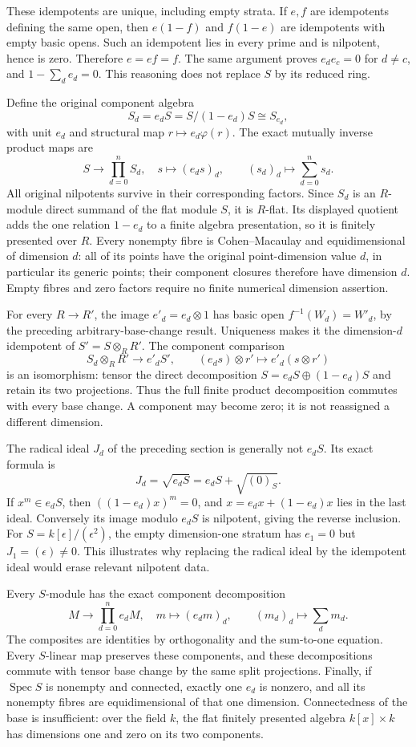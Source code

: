 These idempotents are unique, including empty strata. If \(e,f\) are idempotents defining the same open, then \(e(1-f)\) and \(f(1-e)\) are idempotents with empty basic opens. Such an idempotent lies in every prime and is nilpotent, hence is zero. Therefore \(e=ef=f\). The same argument proves \(e_de_c=0\) for \(d\ne c\), and \(1-\sum_d e_d=0\). This reasoning does not replace \(S\) by its reduced ring.

Define the original component algebra \[
S_d=e_dS=S/(1-e_d)S\cong S_{e_d},
\] with unit \(e_d\) and structural map \(r\mapsto e_d\varphi(r)\). The exact mutually inverse product maps are \[
S\longrightarrow\prod_{d=0}^nS_d,\quad s\longmapsto(e_ds)_d,
\qquad
(s_d)_d\longmapsto\sum_{d=0}^n s_d.
\] All original nilpotents survive in their corresponding factors. Since \(S_d\) is an \(R\)-module direct summand of the flat module \(S\), it is \(R\)-flat. Its displayed quotient adds the one relation \(1-e_d\) to a finite algebra presentation, so it is finitely presented over \(R\). Every nonempty fibre is Cohen--Macaulay and equidimensional of dimension \(d\): all of its points have the original point-dimension value \(d\), in particular its generic points; their component closures therefore have dimension \(d\). Empty fibres and zero factors require no finite numerical dimension assertion.

For every \(R\to R'\), the image \(e'_d=e_d\otimes1\) has basic open \(f^{-1}(W_d)=W'_d\), by the preceding arbitrary-base-change result. Uniqueness makes it the dimension-\(d\) idempotent of \(S'=S\otimes_R R'\). The component comparison \[
S_d\otimes_R R'\longrightarrow e'_dS',
\qquad (e_ds)\otimes r'\longmapsto e'_d(s\otimes r')
\] is an isomorphism: tensor the direct decomposition \(S=e_dS\oplus(1-e_d)S\) and retain its two projections. Thus the full finite product decomposition commutes with every base change. A component may become zero; it is not reassigned a different dimension.

The radical ideal \(J_d\) of the preceding section is generally not \(e_dS\). Its exact formula is \[
J_d=\sqrt{e_dS}=e_dS+\sqrt{(0)_S}.
\] If \(x^m\in e_dS\), then \(((1-e_d)x)^m=0\), and \(x=e_dx+(1-e_d)x\) lies in the last ideal. Conversely its image modulo \(e_dS\) is nilpotent, giving the reverse inclusion. For \(S=k[\epsilon]/(\epsilon^2)\), the empty dimension-one stratum has \(e_1=0\) but \(J_1=(\epsilon)\ne0\). This illustrates why replacing the radical ideal by the idempotent ideal would erase relevant nilpotent data.

Every \(S\)-module has the exact component decomposition \[
M\longrightarrow\prod_{d=0}^n e_dM,\quad m\longmapsto(e_dm)_d,
\qquad (m_d)_d\longmapsto\sum_d m_d.
\] The composites are identities by orthogonality and the sum-to-one equation. Every \(S\)-linear map preserves these components, and these decompositions commute with tensor base change by the same split projections. Finally, if \(\operatorname{Spec}S\) is nonempty and connected, exactly one \(e_d\) is nonzero, and all its nonempty fibres are equidimensional of that one dimension. Connectedness of the base is insufficient: over the field \(k\), the flat finitely presented algebra \(k[x]\times k\) has dimensions one and zero on its two components.

